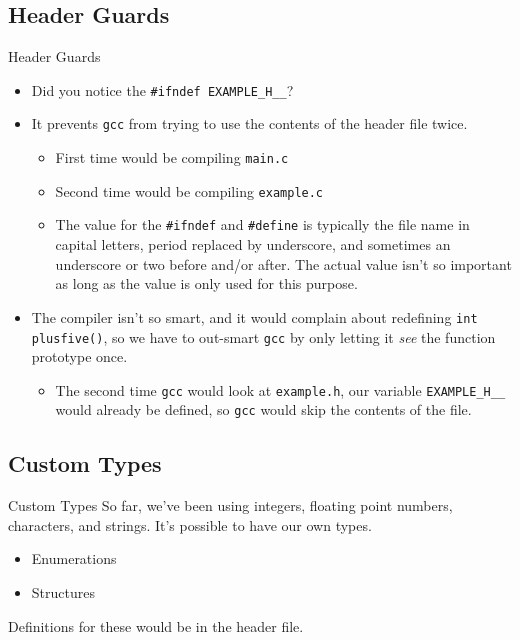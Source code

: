 \documentclass[graphics]{beamer}
\begin{document}
\subsection{Header Guards}
\begin{frame}{Header Guards}
    \begin{itemize}
        \item Did you notice the \texttt{\#ifndef EXAMPLE\_H\_\_}?
        \item It prevents \texttt{gcc} from trying to use the contents of the header file twice.
        \begin{itemize}
            \item First time would be compiling \texttt{main.c}
            \item Second time would be compiling \texttt{example.c}
            \item The value for the \texttt{\#ifndef} and \texttt{\#define} is typically the file name in capital letters, period replaced by underscore, and sometimes an underscore or two before and/or after. The actual value isn't so important as long as the value is only used for this purpose.
        \end{itemize}
        \item The compiler isn't so smart, and it would complain about redefining \texttt{int plusfive()}, so we have to out-smart \texttt{gcc} by only letting it \textit{see} the function prototype once.
        \begin{itemize}
            \item The second time \texttt{gcc} would look at \texttt{example.h}, our variable \texttt{EXAMPLE\_H\_\_} would already be defined, so \texttt{gcc} would skip the contents of the file.
        \end{itemize}
    \end{itemize}
\end{frame}

\subsection{Custom Types}
\begin{frame}{Custom Types}
    So far, we've been using integers, floating point numbers, characters, and strings. It's possible to have our own types.
    \begin{itemize}
        \item Enumerations
        \item Structures
    \end{itemize}
    
    Definitions for these would be in the header file.
\end{frame}
\end{document}
